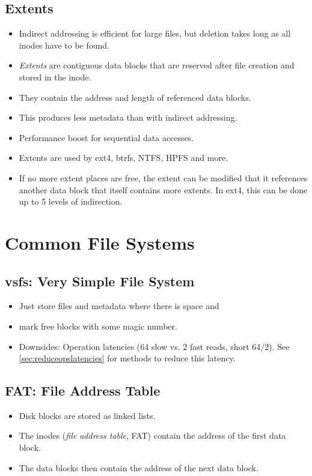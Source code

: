        \subsection{Extents}
	        \begin{itemize}
	        	\item Indirect addressing is efficient for large files, but deletion takes long as all inodes have to be found.
	        	\item \textit{Extents} are contiguous data blocks that are reserved after file creation and stored in the inode.
	        	\item They contain the address and length of referenced data blocks.
	        	\item This produces less metadata than with indirect addressing.
	        	\item Performance boost for sequential data accesses.
	        	\item Extents are used by ext4, btrfs, NTFS, HPFS and more.
	        	\item If no more extent places are free, the extent can be modified that it references another data block that itself contains more extents. In ext4, this can be done up to 5 levels of indirection.
	        \end{itemize}

    \section{Common File Systems}
        \subsection{vsfs: Very Simple File System}
            \begin{itemize}
            	\item Just store files and metadata where there is space and
            	\item mark free blocks with some magic number.
            	\item Downsides: Operation latencies (64 slow vs. 2 fast reads, short 64/2). See \ref{sec:reduceopslatencies} for methods to reduce this latency.
            \end{itemize}

        \subsection{FAT: File Address Table}
            \begin{itemize}
            	\item Disk blocks are stored as linked lists.
            	\item The inodes (\textit{file address table}, FAT) contain the address of the first data block.
            	\item The data blocks then contain the address of the next data block.
            \end{itemize}

